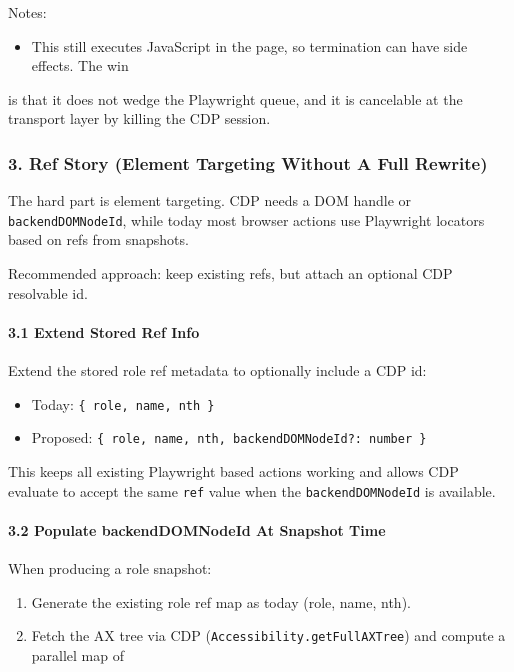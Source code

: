 Notes:

\begin{itemize}
  \item This still executes JavaScript in the page, so termination can have side effects. The win
\end{itemize}

is that it does not wedge the Playwright queue, and it is cancelable at the transport
layer by killing the CDP session.

\subsubsection{3. Ref Story (Element Targeting Without A Full Rewrite)}


The hard part is element targeting. CDP needs a DOM handle or \texttt{backendDOMNodeId}, while
today most browser actions use Playwright locators based on refs from snapshots.

Recommended approach: keep existing refs, but attach an optional CDP resolvable id.

\paragraph{3.1 Extend Stored Ref Info}


Extend the stored role ref metadata to optionally include a CDP id:

\begin{itemize}
  \item Today: \texttt{\{ role, name, nth \}}
  \item Proposed: \texttt{\{ role, name, nth, backendDOMNodeId?: number \}}
\end{itemize}


This keeps all existing Playwright based actions working and allows CDP evaluate to accept
the same \texttt{ref} value when the \texttt{backendDOMNodeId} is available.

\paragraph{3.2 Populate backendDOMNodeId At Snapshot Time}


When producing a role snapshot:

\begin{enumerate}
  \item Generate the existing role ref map as today (role, name, nth).
  \item Fetch the AX tree via CDP (\texttt{Accessibility.getFullAXTree}) and compute a parallel map of
\end{enumerate}

